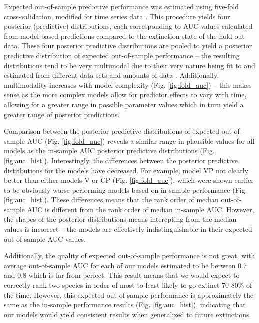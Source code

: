 \documentclass[12pt,letterpaper]{article}
\begin{document}
Expected out-of-sample predictive performance was estimated using five-fold cross-validation, modified for time series data \citep{ESL}. This procedure yields four posterior (predictive) distributions, each corresponding to AUC values calculated from model-based predictions compared to the extinction state of the hold-out data. These four posterior predictive distributions are pooled to yield a posterior predictive distribution of expected out-of-sample performance -- the resulting distributions tend to be very multimodal due to their very nature being fit to and estimated from different data sets and amounts of data \citep{ESL}. Additionally, multimodality increases with model complexity (Fig. \ref{fig:fold_auc}) -- this makes sense as the more complex models allow for predictor effects to vary with time, allowing for a greater range in possible parameter values which in turn yield a greater range of posterior predictions.

Comparison between the posterior predictive distributions of expected out-of-sample AUC (Fig. \ref{fig:fold_auc}) reveals a similar range in plausible values for all models as the in-sample AUC posterior predictive distributions (Fig. \ref{fig:auc_hist}). Interestingly, the differences between the posterior predictive distributions for the models have decreased. For example, model VP not clearly better than either models V or CP (Fig. \ref{fig:fold_auc}), which were shown earlier to be obviously worse-performing models based on in-sample performance (Fig. \ref{fig:auc_hist}). These differences means that the rank order of median out-of-sample AUC is different from the rank order of median in-sample AUC. However, the shapes of the posterior distributions means interepting from the median values is incorrect -- the models are effectively indistinguishable in their expected out-of-sample AUC values.

Additionally, the quality of expected out-of-sample performance is not great, with average out-of-sample AUC for each of our models estimated to be between 0.7 and 0.8 which is far from perfect. This result means that we would expect to correctly rank two species in order of most to least likely to go extinct 70-80\% of the time. However, this expected out-of-sample performance is approximately the same as the in-sample performance results (Fig. \ref{fig:auc_hist}), indicating that our models would yield consistent results when generalized to future extinctions.
\end{document}
